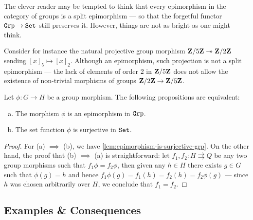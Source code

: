 \begin{remark}
    \label{rem:not-every-grp-epi-is-split}
    The clever reader may be tempted to think that every epimorphism in the category
    of groups is a split epimorphism --- so that the forgetful functor
    \({\texttt{Grp}} \to {\texttt{Set}}\) still preserves it. However, things are not as bright as one
    might think.

    Consider for instance the natural projective group morphism
    \(\mathbf{Z}/5\mathbf{Z} \twoheadrightarrow \mathbf{Z}/2\mathbf{Z}\) sending \([x]_5 \mapsto [x]_2\). Although an epimorphism,
    such projection is not a split epimorphism --- the lack of elements of order
    \(2\) in \(\mathbf{Z}/5\mathbf{Z}\) does not allow the existence of non-trivial morphisms of
    groups \(\mathbf{Z}/2\mathbf{Z} \to \mathbf{Z}/5\mathbf{Z}\).
\end{remark}

\begin{proposition}
    \label{prop:epic-in-grp}
    Let \(\phi: G \to H\) be a group morphism. The following propositions are
    equivalent:
    \begin{enumerate}[(a)]\setlength\itemsep{0em}
        \item The morphism \(\phi\) is an epimorphism in \({\texttt{Grp}}\).
        \item The set function \(\phi\) is surjective in \({\texttt{Set}}\).
    \end{enumerate}
\end{proposition}

\begin{proof}
    For (a) \(\implies\) (b), we have \cref{lem:epimorphism-is-surjective-grp}. On
    the other hand, the proof that (b) \(\implies\) (a) is straightforward: let
    \(f_1, f_2: H \rightrightarrows Q\) be any two group morphisms such that
    \(f_1 \phi = f_2 \phi\), then given any \(h \in H\) there exists \(g \in G\)
    such that \(\phi(g) = h\) and hence \(f_1\phi(g) = f_1(h) = f_2(h) = f_2
    \phi(g)\) --- since \(h\) was chosen arbitrarily over \(H\), we conclude that
    \(f_1 = f_2\).
\end{proof}

\subsection{Examples \& Consequences}

